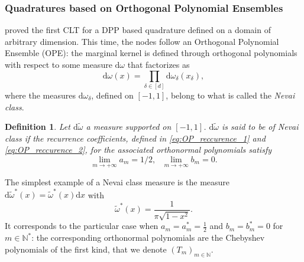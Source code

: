 \documentclass[twoside,11pt]{book}
\newtheorem{definition}{Definition}
\numberwithin{theorem}{chapter}
\numberwithin{definition}{chapter}
\numberwithin{proposition}{chapter}
\numberwithin{corollary}{chapter}
\numberwithin{example}{chapter}
\numberwithin{lemma}{chapter}
\numberwithin{assumption}{chapter}
\numberwithin{equation}{chapter}
\numberwithin{figure}{chapter}
\begin{document}
\subsubsection{Quadratures based on Orthogonal Polynomial Ensembles}
\cite{BaHa16} proved the first CLT for a DPP based quadrature defined on a domain of arbitrary dimension. This time, the nodes follow an Orthogonal Polynomial Ensemble (OPE): the marginal kernel is  defined through orthogonal polynomials with respect to some measure $\mathrm{d}\omega$ that factorizes as
\begin{equation}
\mathrm{d}\omega(x) = \prod\limits_{\delta \in [d]} \mathrm{d}\omega_{\delta}(x_{\delta}),
\end{equation}
where the measures $\mathrm{d}\omega_{\delta}$, defined on $[-1,1]$, belong to what is called the \emph{Nevai class}. 
\begin{definition}
Let $\mathrm{d}\tilde{\omega}$ a measure supported on $[-1,1]$. $\mathrm{d}\tilde{\omega}$ is said to be of Nevai class if 
the recurrence coefficients, defined in \eqref{eq:OP_reccurence_1} and \eqref{eq:OP_reccurence_2}, for
the associated orthonormal polynomials satisfy
\begin{equation}
\lim\limits_{m \rightarrow +\infty} a_{m} = 1/2, \:\:\: \lim\limits_{m \rightarrow +\infty} b_{m} = 0.
\end{equation}
\end{definition}
The simplest example of a Nevai class measure is the measure $\mathrm{d}\tilde{\omega}^{*}(x) = \tilde{\omega}^{*}(x) \mathrm{d}x$ with 
\begin{equation}\label{eq:omega_star}
\tilde{\omega}^{*}(x) = \frac{1}{\pi\sqrt{1-x^{2}}}.
\end{equation}
It corresponds to the particular case when $a_{m} = a^{*}_{m} = \frac{1}{2}$ and $b_m =  b^{*}_{m} =0$ for $m \in \mathbb{N}^{*}$: the corresponding orthonormal polynomials are the Chebyshev polynomials of the first kind, that we denote $(T_{m})_{m \in \mathbb{N}}$.
\end{document}
